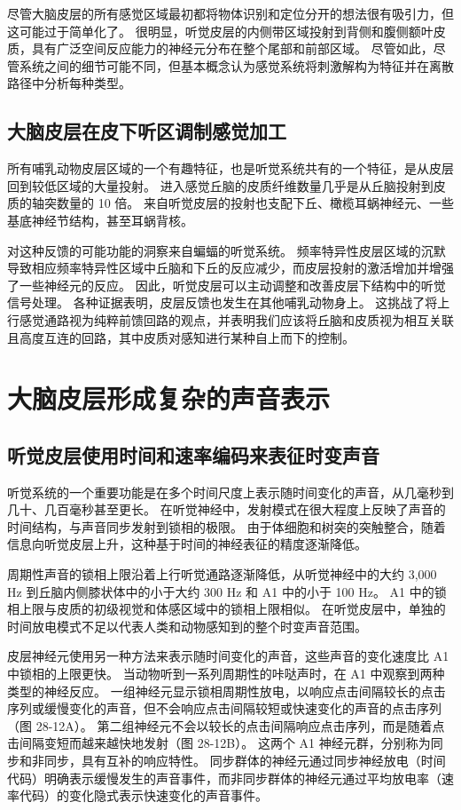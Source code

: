 尽管大脑皮层的所有感觉区域最初都将物体识别和定位分开的想法很有吸引力，但这可能过于简单化了。 很明显，听觉皮层的内侧带区域投射到背侧和腹侧额叶皮质，具有广泛空间反应能力的神经元分布在整个尾部和前部区域。 尽管如此，尽管系统之间的细节可能不同，但基本概念认为感觉系统将刺激解构为特征并在离散路径中分析每种类型。


\subsection{大脑皮层在皮下听区调制感觉加工}
所有哺乳动物皮层区域的一个有趣特征，也是听觉系统共有的一个特征，是从皮层回到较低区域的大量投射。 进入感觉丘脑的皮质纤维数量几乎是从丘脑投射到皮质的轴突数量的 10 倍。 来自听觉皮层的投射也支配下丘、橄榄耳蜗神经元、一些基底神经节结构，甚至耳蜗背核。

对这种反馈的可能功能的洞察来自蝙蝠的听觉系统。 频率特异性皮层区域的沉默导致相应频率特异性区域中丘脑和下丘的反应减少，而皮层投射的激活增加并增强了一些神经元的反应。 因此，听觉皮层可以主动调整和改善皮层下结构中的听觉信号处理。 各种证据表明，皮层反馈也发生在其他哺乳动物身上。 这挑战了将上行感觉通路视为纯粹前馈回路的观点，并表明我们应该将丘脑和皮质视为相互关联且高度互连的回路，其中皮质对感知进行某种自上而下的控制。


\section{大脑皮层形成复杂的声音表示}


\subsection{听觉皮层使用时间和速率编码来表征时变声音}
听觉系统的一个重要功能是在多个时间尺度上表示随时间变化的声音，从几毫秒到几十、几百毫秒甚至更长。 在听觉神经中，发射模式在很大程度上反映了声音的时间结构，与声音同步发射到锁相的极限。 由于体细胞和树突的突触整合，随着信息向听觉皮层上升，这种基于时间的神经表征的精度逐渐降低。

周期性声音的锁相上限沿着上行听觉通路逐渐降低，从听觉神经中的大约 3,000 Hz 到丘脑内侧膝状体中的小于大约 300 Hz 和 A1 中的小于 100 Hz。 A1 中的锁相上限与皮质的初级视觉和体感区域中的锁相上限相似。 在听觉皮层中，单独的时间放电模式不足以代表人类和动物感知到的整个时变声音范围。

皮层神经元使用另一种方法来表示随时间变化的声音，这些声音的变化速度比 A1 中锁相的上限更快。 当动物听到一系列周期性的咔哒声时，在 A1 中观察到两种类型的神经反应。 一组神经元显示锁相周期性放电，以响应点击间隔较长的点击序列或缓慢变化的声音，但不会响应点击间隔较短或快速变化的声音的点击序列（图 28-12A）。 第二组神经元不会以较长的点击间隔响应点击序列，而是随着点击间隔变短而越来越快地发射（图 28-12B）。 这两个 A1 神经元群，分别称为同步和非同步，具有互补的响应特性。 同步群体的神经元通过同步神经放电（时间代码）明确表示缓慢发生的声音事件，而非同步群体的神经元通过平均放电率（速率代码）的变化隐式表示快速变化的声音事件。

